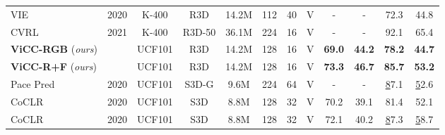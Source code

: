 \documentclass[10pt,twocolumn,letterpaper]{article}
\newcommand\Tstrut{\rule{0pt}{2.2ex}}         \newcommand\Bstrut{\rule[-0.9ex]{0pt}{0pt}}   \usepackage{booktabs}
\begin{document}
\begin{table*}
\begin{center}
{\begin{tabular}{lccccccccccc}
{\color[HTML]{9B9B9B} VIE \cite{zhuang_unsupervised_2020}}  & {\color[HTML]{9B9B9B} 2020}       & {\color[HTML]{9B9B9B} K-400} & {\color[HTML]{9B9B9B} R3D}   & {\color[HTML]{9B9B9B} 14.2M} & {\color[HTML]{9B9B9B} 112} & {\color[HTML]{9B9B9B} 40} & {\color[HTML]{9B9B9B} V}  & {\color[HTML]{9B9B9B} -} & {\color[HTML]{9B9B9B} -} & {\color[HTML]{9B9B9B} 72.3} & {\color[HTML]{9B9B9B} 44.8} \\
{\color[HTML]{9B9B9B} CVRL \cite{qian_spatiotemporal_2021}} & {\color[HTML]{9B9B9B} 2021}        & {\color[HTML]{9B9B9B} K-400} & {\color[HTML]{9B9B9B} R3D-50}   & {\color[HTML]{9B9B9B} 36.1M} & {\color[HTML]{9B9B9B} 224} & {\color[HTML]{9B9B9B} 16} & {\color[HTML]{9B9B9B} V}   & {\color[HTML]{9B9B9B} -} & {\color[HTML]{9B9B9B} -} & {\color[HTML]{9B9B9B} 92.1} & {\color[HTML]{9B9B9B} 65.4} \\ \hline \Tstrut
\textbf{ViCC-RGB} (\textit{ours})                			&                             & UCF101                         & R3D                         & 14.2M                        & 128                        & 16                    & V                        &	\textbf{69.0}
& 	\textbf{44.2} 	     
& 	\textbf{78.2}       
&              	\textbf{44.7} 
\\ 
\textbf{ViCC-R+F} (\textit{ours})               &		                      & UCF101                         & R3D                         & 14.2M                        & 128                        & 16                       & V                        & \textbf{73.3} 
&     	\textbf{46.7} 	       
& \textbf{	85.7}      
&   \textbf{ 53.2} 
\\ \hline \Tstrut
Pace Pred \cite{wang_self-supervised_2020} 							& 2020                   	  & UCF101                         & S3D-G                           & 9.6M                         & 224                        & 64                        & V          &	-	 &  -                 & {\ul 87.1}                  & {\ul 52.6}                  \\
CoCLR  \cite{han_self-supervised_2020}                            	& 2020                        & UCF101                         & S3D                             & 8.8M                         & 128                        & 32                        & V            &	70.2	 &  39.1               & 81.4                        & 52.1                        \\
CoCLR  \cite{han_self-supervised_2020} 								& 2020                        & UCF101                         & S3D                             & 8.8M                         & 128                        & 32                        & V             &	72.1	 &  40.2               & {\ul 87.3}                  & {\ul 58.7}                  \\

\end{tabular}}
\end{center}
\end{table*}
\end{document}
